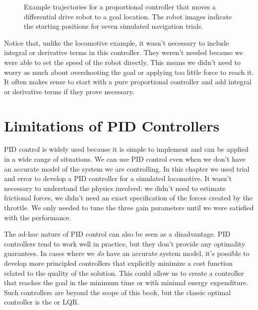 \begin{figure}[h!]
\begin{center}
\end{center}
\caption{Example trajectories for a proportional controller that moves
  a differential drive robot to a goal location.  The robot images
  indicate the starting positions for seven simulated navigation
  trials.}
\label{fig:diff_demo}
\end{figure}


Notice that, unlike the locomotive example, it wasn't necessary to
include integral or derivative terms in this controller.  They
weren't needed because we were able to set the speed of the
robot directly. This means we didn't need to worry as much about
overshooting the goal or applying too little force to reach it.  It
often makes sense to start with a pure proportional controller and add
integral or derivative terms if they prove necessary.

\section{Limitations of PID Controllers}

PID control is widely used because it is simple to implement and can
be applied in a wide range of situations.  We can use PID control even
when we don't have an accurate model of the system we are controlling.
In this chapter we used trial and error to develop a PID controller
for a simulated locomotive.  It wasn't necessary to understand the
physics involved: we didn't need to estimate frictional forces, we
didn't need an exact specification of the forces created by the
throttle.  We only needed to tune the three gain parameters until we
were satisfied with the performance.

The ad-hoc nature of PID control can also be seen as a disadvantage.
PID controllers tend to work well in practice, but they don't provide
any optimality guarantees.  In cases where we \emph{do} have an
accurate system model, it's possible to develop more principled
controllers that explicitly minimize a cost function related to the
quality of the solution.  This could allow us to create a controller
that reaches the goal in the minimum time or with minimal energy
expenditure.  Such controllers are beyond the scope of this book, but
the classic optimal controller is the  or LQR.

